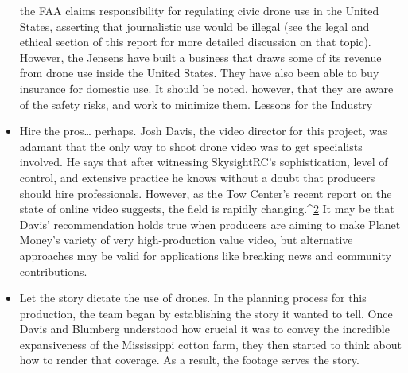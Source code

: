 \begin{itemize}
the FAA claims responsibility for regulating civic drone use in the
United States, asserting that journalistic use would be illegal (see the
legal and ethical section of this report for more detailed discussion
on that topic). However, the Jensens have built a business that draws
some of its revenue from drone use inside the United States. They
have also been able to buy insurance for domestic use. It should be
noted, however, that they are aware of the safety risks, and work to
minimize them.
Lessons for the Industry
\item Hire the pros… perhaps.
Josh Davis, the video director for this project, was adamant that the
only way to shoot drone video was to get specialists involved. He says
that after witnessing SkysightRC's sophistication, level of control, and
extensive practice he knows without a doubt that producers should
hire professionals. However, as the Tow Center's recent report on the
state of online video suggests, the field is rapidly changing.^{\href{#endnotes-planet-money}{2}} It may be
that Davis' recommendation holds true when producers are aiming to
make Planet Money's variety of very high-production value video, but
alternative approaches may be valid for applications like breaking
news and community contributions.
\item Let the story dictate the use of drones.
In the planning process for this production, the team began by establishing
the story it wanted to tell. Once Davis and Blumberg understood
how crucial it was to convey the incredible expansiveness of
the Mississippi cotton farm, they then started to think about how to
render that coverage. As a result, the footage serves the story.
\end{itemize}

